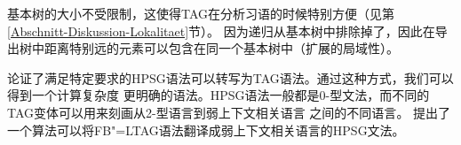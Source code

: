 基本树的大小不受限制，这使得TAG在分析习语的时候特别方便（见第\ref{Abschnitt-Diskussion-Lokalitaet}节）。
因为递归从基本树中排除掉了，因此在导出树中距离特别远的元素可以包含在同一个基本树中（扩展的局域性）。

 \citet*{KKNV95a}论证了满足特定要求的HPSG语法可以转写为TAG语法。通过这种方式，我们可以得到一个计算复杂度
更明确的语法。HPSG语法一般都是0-型文法，而不同的TAG变体可以用来刻画从2-型语言到弱上下文相关语言
之间的不同语言\citep{Joshi85a-u}。 \citet*{YMTT2001a}提出了一个算法可以将FB"=LTAG语法翻译成弱上下文相关语言的HPSG文法。

{}


